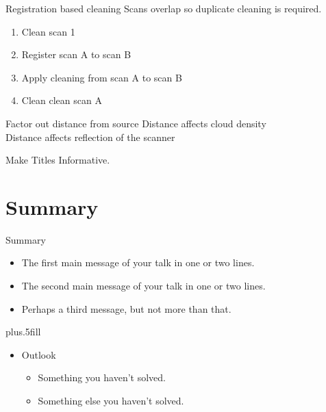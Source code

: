 \documentclass{beamer}
\begin{document}
\begin{frame}{Registration based cleaning}
  Scans overlap so duplicate cleaning is required.
  \begin{enumerate}
  \item Clean scan 1
  \item Register scan A to scan B
  \item Apply cleaning from scan A to scan B
  \item Clean clean scan A
  \end{enumerate}

\end{frame}

\begin{frame}{Factor out distance from source}
  Distance affects cloud density\\
  Distance affects reflection of the scanner
\end{frame}

\begin{frame}{Make Titles Informative.}
\end{frame}



\section*{Summary}

\begin{frame}{Summary}

  \begin{itemize}
  \item
    The \alert{first main message} of your talk in one or two lines.
  \item
    The \alert{second main message} of your talk in one or two lines.
  \item
    Perhaps a \alert{third message}, but not more than that.
  \end{itemize}
  
  \vskip0pt plus.5fill
  \begin{itemize}
  \item
    Outlook
    \begin{itemize}
    \item
      Something you haven't solved.
    \item
      Something else you haven't solved.
    \end{itemize}
  \end{itemize}
\end{frame}
\end{document}
